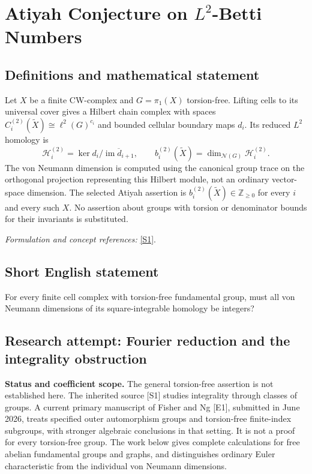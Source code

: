 \documentclass[11pt]{article}
\begin{document}
\section*{\texorpdfstring{Atiyah Conjecture on $L^2$-Betti Numbers}{Atiyah Conjecture on \$L\textasciicircum{}2\$-Betti Numbers}}\label{30000209}
\subsection{Definitions and mathematical statement}
Let $X$ be a finite CW-complex and $G=\pi_1(X)$ torsion-free. Lifting cells to its universal cover gives a Hilbert chain complex with spaces $C_i^{(2)}(\widetilde X)\cong\ell^2(G)^{c_i}$ and bounded cellular boundary maps $d_i$. Its reduced $L^2$ homology is
\[
 \mathcal H_i^{(2)}=\ker d_i\big/\overline{\operatorname{im}d_{i+1}},
 \qquad b_i^{(2)}(\widetilde X)=\dim_{\mathcal N(G)}\mathcal H_i^{(2)}.
\]
The von Neumann dimension is computed using the canonical group trace on the orthogonal projection representing this Hilbert module, not an ordinary vector-space dimension. The selected Atiyah assertion is $b_i^{(2)}(\widetilde X)\in{\mathbb{Z}}_{\ge0}$ for every $i$ and every such $X$. No assertion about groups with torsion or denominator bounds for their invariants is substituted.
\par\smallskip\textit{Formulation and concept references:} \href{https://arxiv.org/abs/math/0001101}{[S1]}.

\subsection{Short English statement}
For every finite cell complex with torsion-free fundamental group, must all von Neumann dimensions of its square-integrable homology be integers?
\subsection{Research attempt: Fourier reduction and the integrality obstruction}
\textbf{Status and coefficient scope.} The general torsion-free assertion is not established here. The inherited source [S1] studies integrality through classes of groups. A current primary manuscript of Fisher and Ng [E1], submitted in June 2026, treats specified outer automorphism groups and torsion-free finite-index subgroups, with stronger algebraic conclusions in that setting. It is not a proof for every torsion-free group. The work below gives complete calculations for free abelian fundamental groups and graphs, and distinguishes ordinary Euler characteristic from the individual von Neumann dimensions.
\end{document}
